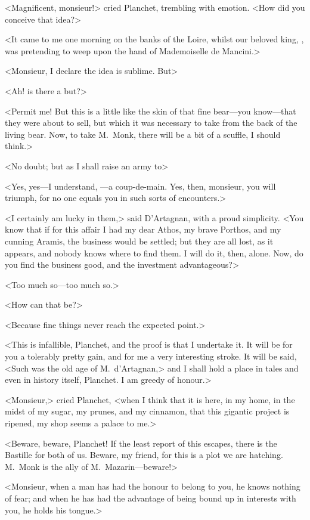 <Magnificent, monsieur!> cried Planchet, trembling with emotion. <How did you conceive that idea?>

<It came to me one morning on the banks of the Loire, whilst our beloved king, , was pretending to weep upon the hand of Mademoiselle de Mancini.>

<Monsieur, I declare the idea is sublime. But\longdash>

<Ah! is there a but?>

<Permit me! But this is a little like the skin of that fine bear—you know—that they were about to sell, but which it was necessary to take from the back of the living bear. Now, to take M.~Monk, there will be a bit of a scuffle, I should think.>

<No doubt; but as I shall raise an army to\longdash>

<Yes, yes—I understand, —a coup-de-main. Yes, then, monsieur, you will triumph, for no one equals you in such sorts of encounters.>

<I certainly am lucky in them,> said D'Artagnan, with a proud simplicity. <You know that if for this affair I had my dear Athos, my brave Porthos, and my cunning Aramis, the business would be settled; but they are all lost, as it appears, and nobody knows where to find them. I will do it, then, alone. Now, do you find the business good, and the investment advantageous?>

<Too much so—too much so.>

<How can that be?>

<Because fine things never reach the expected point.>

<This is infallible, Planchet, and the proof is that I undertake it. It will be for you a tolerably pretty gain, and for me a very interesting stroke. It will be said, <Such was the old age of M.~d'Artagnan,> and I shall hold a place in tales and even in history itself, Planchet. I am greedy of honour.>

<Monsieur,> cried Planchet, <when I think that it is here, in my home, in the midst of my sugar, my prunes, and my cinnamon, that this gigantic project is ripened, my shop seems a palace to me.>

<Beware, beware, Planchet! If the least report of this escapes, there is the Bastille for both of us. Beware, my friend, for this is a plot we are hatching. M.~Monk is the ally of M.~Mazarin—beware!>

<Monsieur, when a man has had the honour to belong to you, he knows nothing of fear; and when he has had the advantage of being bound up in interests with you, he holds his tongue.>

